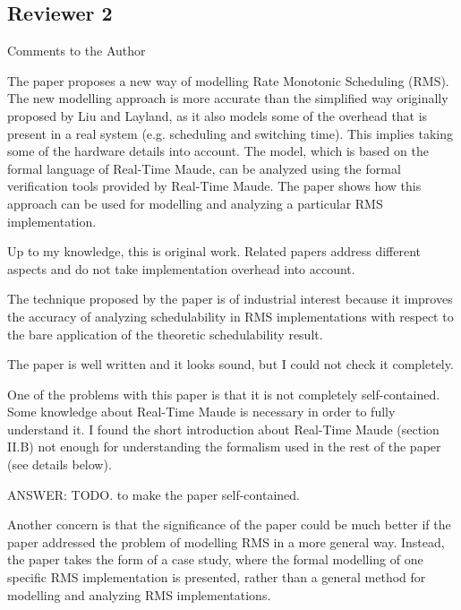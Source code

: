 \documentclass[10pt,journal]{IEEEtran}
\begin{document}
\subsection{Reviewer 2}
Comments to the Author

The paper proposes a new way of modelling Rate Monotonic Scheduling
(RMS).  The new modelling approach is more accurate than the
simplified way originally proposed by Liu and Layland, as it also
models some of the overhead that is present in a real system
(e.g. scheduling and switching time).  This implies taking some of the
hardware details into account.  The model, which is based on the
formal language of Real-Time Maude, can be analyzed using the formal
verification tools provided by Real-Time Maude.  The paper shows how
this approach can be used for modelling and analyzing a particular RMS
implementation.

Up to my knowledge, this is original work. Related papers address
different aspects and do not take implementation overhead into
account.

The technique proposed by the paper is of industrial interest because
it improves the accuracy of analyzing schedulability in RMS
implementations with respect to the bare application of the theoretic
schedulability result.

The paper is well written and it looks sound, but I could not check it
completely.

One of the problems with this paper is that it is not completely
self-contained.  Some knowledge about Real-Time Maude is necessary in
order to fully understand it.  I found the short introduction about
Real-Time Maude (section II.B) not enough for understanding the
formalism used in the rest of the paper (see details below).

ANSWER: TODO. to make the paper self-contained.

Another concern is that the significance of the paper could be much
better if the paper addressed the problem of modelling RMS in a more
general way. Instead, the paper takes the form of a case study, where
the formal modelling of one specific RMS implementation is presented,
rather than a general method for modelling and analyzing RMS
implementations.  
\end{document}
